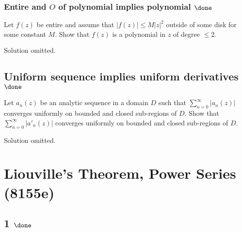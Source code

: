 \hypertarget{entire-and-o-of-polynomial-implies-polynomial-done}{%
\subsubsection{\texorpdfstring{Entire and \(O\) of polynomial implies
polynomial
\(\done\)}{Entire and O of polynomial implies polynomial \textbackslash done}}\label{entire-and-o-of-polynomial-implies-polynomial-done}}

\begin{problem}[?]

Let \(f(z)\) be entire and assume that
\({\left\lvert {f(z)} \right\rvert} \leq M |z|^2\) outside of some disk
for some constant \(M\). Show that \(f(z)\) is a polynomial in \(z\) of
degree \(\leq 2\).

\end{problem}

Solution omitted.

\hypertarget{uniform-sequence-implies-uniform-derivatives-done}{%
\subsection{\texorpdfstring{Uniform sequence implies uniform derivatives
\(\done\)}{Uniform sequence implies uniform derivatives \textbackslash done}}\label{uniform-sequence-implies-uniform-derivatives-done}}

\begin{problem}[?]

Let \(a_n(z)\) be an analytic sequence in a domain \(D\) such that
\(\displaystyle \sum_{n=0}^\infty |a_n(z)|\) converges uniformly on
bounded and closed sub-regions of \(D\). Show that
\(\displaystyle \sum_{n=0}^\infty |a'_n(z)|\) converges uniformly on
bounded and closed sub-regions of \(D\).

\end{problem}

Solution omitted.

\hypertarget{liouvilles-theorem-power-series-8155e}{%
\section{Liouville's Theorem, Power Series
(8155e)}\label{liouvilles-theorem-power-series-8155e}}

\hypertarget{done-3}{%
\subsection{\texorpdfstring{1
\(\done\)}{1 \textbackslash done}}\label{done-3}}

